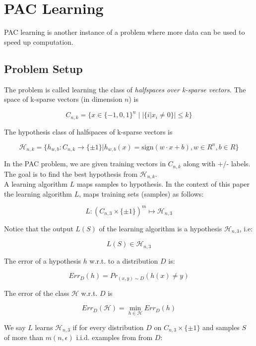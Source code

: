 \documentclass[11pt,a4paper]{article}
\begin{document}

\section{PAC Learning}

PAC learning is another instance of a problem where more data can be used to speed up computation.

\subsection{Problem Setup}

The problem is called learning the class of \textit{halfspaces over k-sparse vectors}. The space of k-sparse vectors (in dimension $n$) is

$$C_{n, k} = \{x \in \{-1, 0, 1\}^n \mid |\{i | x_i \neq 0\}| \leq k\}$$

The hypothesis class of halfspaces of k-sparse vectors is

$$\mathcal{H}_{n, k} = \{h_{w, b} : C_{n, k} \rightarrow \{\pm1\} | h_{w, b}(x) = \textrm{sign}(w \cdot x + b), w \in R^n, b \in R\}$$

In the PAC problem, we are given training vectors in $C_{n, k}$ along with +/- labels. The goal is to find the best hypothesis from $\mathcal{H}_{n, k}$.\\

A learning algorithm $L$ maps samples to hypothesis. In the context of this paper the learning algorithm $L$, maps training sets (samples) as follows:

$$L : (C_{n,3} \times \{ \pm 1 \} )^m \mapsto \mathcal{H}_{n,3}$$

Notice that the output $L(S)$ of the learning algorithm is a hypothesis $\mathcal{H}_{n,3}$, i.e:

$$L(S) \in \mathcal{H}_{n,3}$$

The error of a hypothesis $h$ w.r.t. to a distribution $D$ is:

$$ Err_{D}(h) = Pr_{(x,y) \sim D} (h(x) \neq y)$$

The error of the class $\mathcal{H}$ w.r.t. $D$ is

$$ Err_D(\mathcal{H}) = \min_{h \in \mathcal{H}} Err_D(h)$$

We say $L$ learns $\mathcal{H}_{n,3}$ if for every distribution $D$ on $C_{n,3} \times \{ \pm 1 \}$ and samples $S$ of more than $m(n, \epsilon)$ i.i.d. examples from from $D$:
\end{document}
